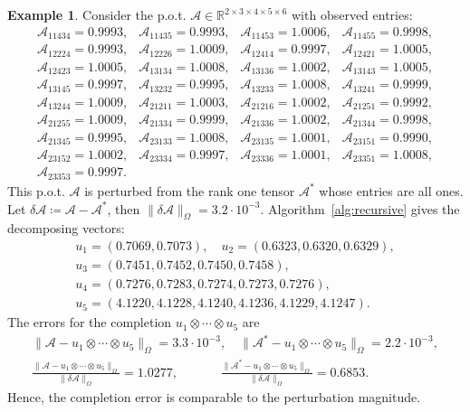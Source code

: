 \documentclass{amsart}
\newcommand{\re}{\mathbb{R}}
\newcommand{\dt}{\delta}
\newcommand{\mc}[1]{\mathcal{#1}}
\newcommand{\baray}{\begin{array}}
\newcommand{\earay}{\end{array}}
\theoremstyle{definition}
\newtheorem{example}[theorem]{Example}
\numberwithin{equation}{section}
\begin{document}
\begin{example}
Consider the p.o.t. $\mc{A} \in \re^{2 \times 3 \times 4 \times 5 \times 6}$ with observed entries:
\[
\baray{cccc}
\mc{A}_{11434} = 0.9993, 
& \mc{A}_{11435} = 0.9993, 
& \mc{A}_{11453} = 1.0006, 
& \mc{A}_{11455} = 0.9998, \\
\mc{A}_{12224} = 0.9993, 
& \mc{A}_{12226} = 1.0009, 
& \mc{A}_{12414} = 0.9997, 
& \mc{A}_{12421} = 1.0005, \\
\mc{A}_{12423} = 1.0005, 
& \mc{A}_{13134} = 1.0008, 
& \mc{A}_{13136} = 1.0002, 
& \mc{A}_{13143} = 1.0005, \\
\mc{A}_{13145} = 0.9997, 
& \mc{A}_{13232} = 0.9995, 
& \mc{A}_{13233} = 1.0008, 
& \mc{A}_{13241} = 0.9999, \\
\mc{A}_{13244} = 1.0009, 
& \mc{A}_{21211} = 1.0003, 
& \mc{A}_{21216} = 1.0002, 
& \mc{A}_{21251} = 0.9992, \\
\mc{A}_{21255} = 1.0009, 
& \mc{A}_{21334} = 0.9999, 
& \mc{A}_{21336} = 1.0002, 
& \mc{A}_{21344} = 0.9998, \\
\mc{A}_{21345} = 0.9995, 
& \mc{A}_{23133} = 1.0008, 
& \mc{A}_{23135} = 1.0001, 
& \mc{A}_{23151} = 0.9990, \\
\mc{A}_{23152} = 1.0002, 
& \mc{A}_{23334} = 0.9997, 
& \mc{A}_{23336} = 1.0001, 
& \mc{A}_{23351} = 1.0008, \\
\mc{A}_{23353} = 0.9997.
\earay
\]
This p.o.t. $\mc{A}$ is perturbed from the rank one tensor $\mc{A}^*$ whose entries are all ones.
Let $\dt\mc{A} \coloneqq \mc{A} - \mc{A}^*$, then
$
\|\dt\mc{A}\|_{\Omega}=3.2 \cdot 10^{-3}.
$
Algorithm~\ref{alg:recursive} gives the decomposing vectors:
\[
\baray{l}
u_1 = (0.7069,
0.7073),
\quad u_2 = (0.6323,
0.6320,
0.6329), \\
u_3 = (0.7451,
0.7452,
0.7450,
0.7458), \\
u_4 = (0.7276,
0.7283,
0.7274,
0.7273,
0.7276), \\
u_5 = (4.1220,
4.1228,
4.1240,
4.1236,
4.1229,
4.1247).
\earay
\]
The errors for the completion $u_1 \otimes \cdots  \otimes u_5$ are
\[
\begin{gathered}
\|\mc{A} - u_1 \otimes \cdots \otimes u_5 \|_{\Omega} = 3.3  \cdot 10^{-3},
\quad \|\mc{A}^* - u_1 \otimes \cdots \otimes u_5 \|_{\Omega} = 2.2  \cdot 10^{-3}, \\
\frac{\|\mc{A} - u_1 \otimes \cdots \otimes u_5 \|_{\Omega}}{\|\dt\mc{A}\|_{\Omega}} = 1.0277,
\quad\qquad \,\,\frac{\|\mc{A}^* - u_1 \otimes \cdots \otimes u_5 \|_{\Omega}}{\|\dt\mc{A}\|_{\Omega}} = 0.6853.
\end{gathered}
\]
Hence, the completion error is comparable to the perturbation magnitude.
\end{example}
\end{document}

